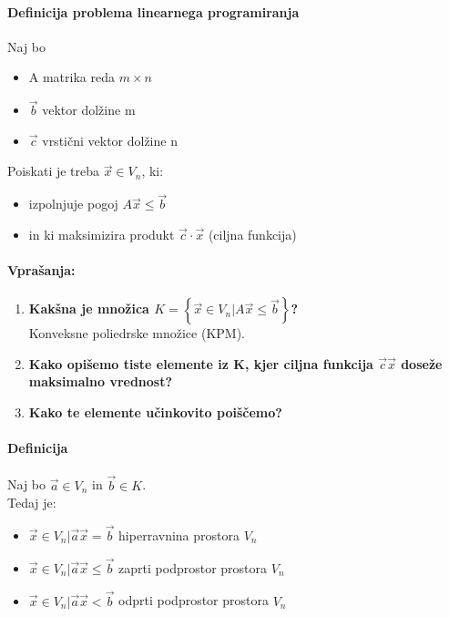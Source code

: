 \documentclass[a4paper,10pt]{article}
\begin{document}
\paragraph{Definicija problema linearnega programiranja}
Naj bo
\begin{itemize}
\item A matrika reda $m \times n$
\item $\vec{b}$ vektor dol\v zine m
\item $\vec{c}$ vrsti\v cni vektor dol\v zine n
\end{itemize}
Poiskati je treba $\vec{x} \in V_n$, ki:
\begin{itemize}
\item izpolnjuje pogoj $A\vec{x} \leq \vec{b}$
\item in ki maksimizira produkt $\vec{c} \cdot \vec{x}$ (ciljna funkcija)
\end{itemize}

\paragraph{Vpra\v sanja:}
\begin{enumerate}
\item \textbf{Kak\v sna je mno\v zica $K = \left\lbrace \vec{x} \in V_n | A\vec{x} \leq \vec{b} \right\rbrace$?}\\
Konveksne poliedrske mno\v zice (KPM).
\item \textbf{Kako opi\v semo tiste elemente iz K, kjer ciljna funkcija $\vec{c}\vec{x}$ dose\v ze maksimalno vrednost?}
\item \textbf{Kako te elemente u\v cinkovito poi\v s\v cemo?}
\end{enumerate}

\paragraph{Definicija}
Naj bo $\vec{a} \in V_n$ in $\vec{b} \in K$.\\
Tedaj je:
\begin{itemize}
\item ${\vec x \in V_n | \vec a \vec x = \vec b}$ hiperravnina prostora $V_n$
\item ${\vec x \in V_n | \vec a \vec x \leq \vec b}$ zaprti podprostor prostora $V_n$
\item ${\vec x \in V_n | \vec a \vec x < \vec b}$ odprti podprostor prostora $V_n$
\end{itemize}
\end{document}
